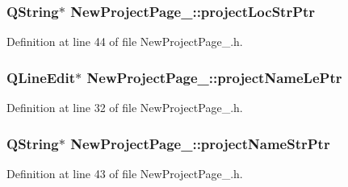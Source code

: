 \hypertarget{class_new_project_page__2_aeef81f262fde93b45f7264515bee334d}{
\subsubsection[{project\-Loc\-Str\-Ptr}]{\setlength{\rightskip}{0pt plus 5cm}Q\-String$\ast$ New\-Project\-Page\-\_\-::project\-Loc\-Str\-Ptr\hspace{0.3cm}{\ttfamily [private]}}}\label{class_new_project_page__2_aeef81f262fde93b45f7264515bee334d}


Definition at line 44 of file New\-Project\-Page\-\_.\-h.

\hypertarget{class_new_project_page__2_a8d955d78824c84ca7943b1af2ace11b0}{
\subsubsection[{project\-Name\-Le\-Ptr}]{\setlength{\rightskip}{0pt plus 5cm}Q\-Line\-Edit$\ast$ New\-Project\-Page\-\_\-::project\-Name\-Le\-Ptr\hspace{0.3cm}{\ttfamily [private]}}}\label{class_new_project_page__2_a8d955d78824c84ca7943b1af2ace11b0}


Definition at line 32 of file New\-Project\-Page\-\_.\-h.

\hypertarget{class_new_project_page__2_ad3fb4b5248b01e40660cbb91ebd215c9}{
\subsubsection[{project\-Name\-Str\-Ptr}]{\setlength{\rightskip}{0pt plus 5cm}Q\-String$\ast$ New\-Project\-Page\-\_\-::project\-Name\-Str\-Ptr\hspace{0.3cm}{\ttfamily [private]}}}\label{class_new_project_page__2_ad3fb4b5248b01e40660cbb91ebd215c9}


Definition at line 43 of file New\-Project\-Page\-\_.\-h.

